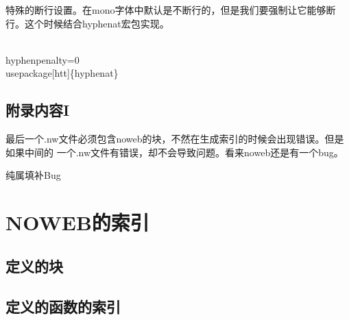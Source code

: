 \documentclass{hnuthesis}%
\begin{document}
特殊的断行设置。在mono字体中默认是不断行的，但是我们要强制让它能够断行。这个时候结合hyphenat宏包实现。

\begin{nowebtrunk}
\nwenddocs{}\endmoddef\nwstartdeflinemarkup\nwenddeflinemarkup
\\hyphenpenalty=0
\\usepackage[htt]\{hyphenat\}
\nwendcode{}\end{nowebtrunk}




\subsection{附录内容I}

最后一个.nw文件必须包含noweb的块，不然在生成索引的时候会出现错误。但是如果中间的
一个.nw文件有错误，却不会导致问题。看来noweb还是有一个bug。

\begin{nowebtrunk}
\nwenddocs{}\endmoddef\nwstartdeflinemarkup\nwenddeflinemarkup
纯属填补Bug
\nwendcode{}\end{nowebtrunk}

\section{NOWEB的索引}

\subsection{定义的块}

\nowebchunks


\subsection{定义的函数的索引} 

\nowebindex
\end{document}
